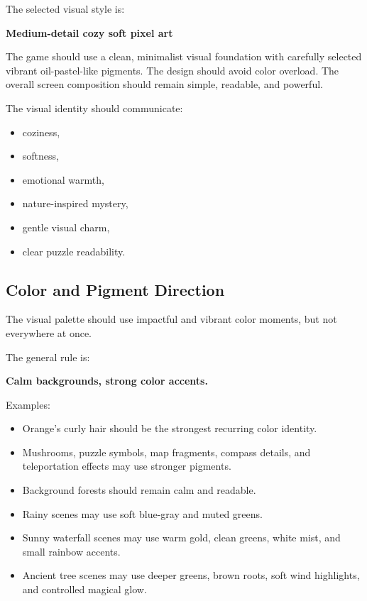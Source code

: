 \documentclass[12pt]{article}
\begin{document}
The selected visual style is:

\begin{center}
\textbf{Medium-detail cozy soft pixel art}
\end{center}

The game should use a clean, minimalist visual foundation with carefully selected vibrant oil-pastel-like pigments. The design should avoid color overload. The overall screen composition should remain simple, readable, and powerful.

The visual identity should communicate:

\begin{itemize}[leftmargin=*]
    \item coziness,
    \item softness,
    \item emotional warmth,
    \item nature-inspired mystery,
    \item gentle visual charm,
    \item clear puzzle readability.
\end{itemize}

\subsection{Color and Pigment Direction}

The visual palette should use impactful and vibrant color moments, but not everywhere at once.

The general rule is:

\begin{center}
\textbf{Calm backgrounds, strong color accents.}
\end{center}

Examples:

\begin{itemize}[leftmargin=*]
    \item Orange's curly hair should be the strongest recurring color identity.
    \item Mushrooms, puzzle symbols, map fragments, compass details, and teleportation effects may use stronger pigments.
    \item Background forests should remain calm and readable.
    \item Rainy scenes may use soft blue-gray and muted greens.
    \item Sunny waterfall scenes may use warm gold, clean greens, white mist, and small rainbow accents.
    \item Ancient tree scenes may use deeper greens, brown roots, soft wind highlights, and controlled magical glow.
\end{itemize}
\end{document}
